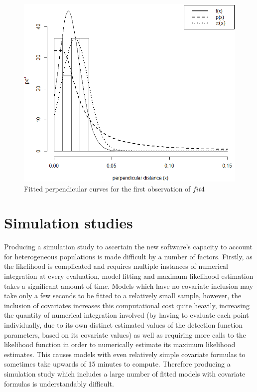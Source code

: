 \documentclass[11pt]{article}
\begin{document}
\begin{multicols}{2}
\begin{figure}[H]
\center
\includegraphics[scale=0.53]{fig12}
\caption{Fitted perpendicular curves for the first observation of $fit4$}
\end{figure}

\section{Simulation studies}
Producing a simulation study to ascertain the new software's capacity to account for heterogeneous populations is made difficult by a number of factors. Firstly, as the \cite{Borchers} likelihood is complicated and requires multiple instances of numerical integration at every evaluation, model fitting and maximum likelihood estimation takes a significant amount of time. Models which have no covariate inclusion may take only a few seconds to be fitted to a relatively small sample, however, the inclusion of covariates increases this computational cost quite heavily, increasing the quantity of numerical integration involved (by having to evaluate each point individually, due to its own distinct estimated values of the detection function parameters, based on its covariate values) as well as requiring more calls to the likelihood function in order to numerically estimate its maximum likelihood estimates. This causes models with even relatively simple covariate formulas to sometimes take upwards of 15 minutes to compute. Therefore producing a simulation study which includes a large number of fitted models with covariate formulas is understandably difficult.\\\\


\end{multicols}
\end{document}

